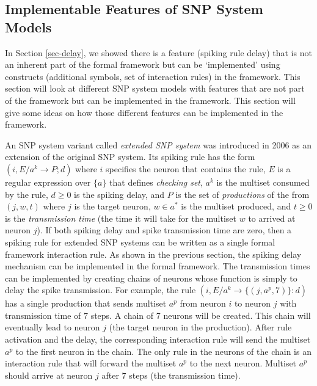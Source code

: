 \documentclass[a4paper]{article}
\theoremstyle{definition}
\newcommand{\ra}{\rightarrow}
\begin{document}

\subsection{Implementable Features of SNP System Models}\label{sec-implementation}

In Section \ref{sec-delay}, we showed there is a feature (spiking rule delay) that is not an
inherent part of the formal framework but can be `implemented' using constructs (additional symbols,
set of interaction rules) in the framework. This section will look at different SNP system models
with features that are not part of the framework but can be implemented in the framework. This 
section will give some ideas on how those different features can be implemented in the framework.


An SNP system variant called \emph{extended SNP system} \cite{alhazov-2006-esnp} was introduced in
2006 as an extension of the original SNP system. Its spiking rule has the form $(i, E/a^k \ra P;d)$ 
where $i$ specifies the neuron that contains the rule, $E$ is a regular expression over $\{a\}$ that
defines \emph{checking set}, $a^k$ is the multiset consumed by the rule, $d \geq 0$ is the 
spiking delay, and $P$ is the set of \emph{productions} of the from $(j, w, t)$ where $j$ is the 
target neuron, $w \in {a}^*$ is the multiset produced, and $t \geq 0$ is the \emph{transmission 
time} (the time it will take for the multiset $w$ to arrived at neuron $j$). If both spiking delay
and spike transmission time are zero, then a spiking rule for extended SNP systems can be written as
a single formal framework interaction rule. As shown in the previous section, the spiking delay
mechanism can be implemented in the formal framework. The transmission times can be implemented by
creating chains of neurons whose function is simply to delay the spike transmission. For example,
the rule $(i, E/a^k \ra \{(j,a^p, 7)\}:d)$ has a single production that sends multiset $a^p$ from
neuron $i$ to neuron $j$ with transmission time of $7$ steps. A chain of 7 neurons will be 
created. This chain will eventually lead to neuron $j$ (the target neuron in the production). After 
rule activation and the delay, the corresponding interaction rule will send the multiset $a^p$ to the 
first neuron in the chain. The only rule in the neurons of the chain is an interaction rule that 
will forward the multiset $a^p$ to the next neuron. Multiset $a^p$ should arrive at neuron $j$ after
$7$ steps (the transmission time).
\end{document}
